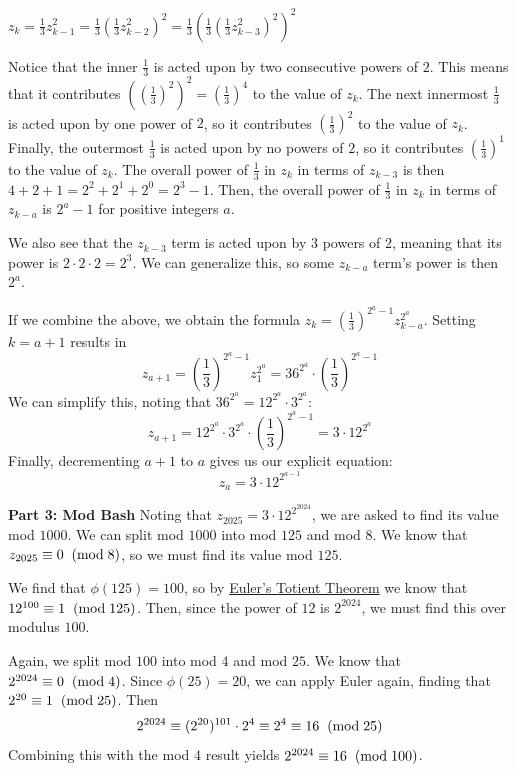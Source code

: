 \begin{enumerate}
 $z_k=\frac{1}{3}z_{k-1}^2=\frac{1}{3}\left(\frac{1}{3}z_{k-2}^2\right)^2=\frac{1}{3}\left(\frac{1}{3}\left(\frac{1}{3}z_{k-3}^2\right)^2\right)^2$

 Notice that the inner $\frac{1}{3}$ is acted upon by two consecutive powers of $2$. This means that it contributes $\left(\left(\frac{1}{3}\right)^2\right)^2=\left(\frac{1}{3}\right)^4$ to the value of $z_k$. The next innermost $\frac{1}{3}$ is acted upon by one power of $2$, so it contributes $\left(\frac{1}{3}\right)^2$ to the value of $z_k$. Finally, the outermost $\frac{1}{3}$ is acted upon by no powers of $2$, so it contributes $\left(\frac{1}{3}\right)^1$ to the value of $z_k$. The overall power of $\frac{1}{3}$ in $z_k$ in terms of $z_{k-3}$ is then $4+2+1=2^2+2^1+2^0=2^3-1$. Then, the overall power of $\frac{1}{3}$ in $z_k$ in terms of $z_{k-a}$ is $2^a-1$ for positive integers $a$.

 We also see that the $z_{k-3}$ term is acted upon by $3$ powers of $2$, meaning that its power is $2\cdot2\cdot2=2^3$. We can generalize this, so some $z_{k-a}$ term's power is then $2^a$.

 If we combine the above, we obtain the formula $z_k=\left(\frac{1}{3}\right)^{2^a-1}z_{k-a}^{2^a}$. Setting $k=a+1$ results in
 \[z_{a+1}=\left(\frac{1}{3}\right)^{2^a-1}z_1^{2^a}=36^{2^a}\cdot\left(\frac{1}{3}\right)^{2^a-1}\]We can simplify this, noting that $36^{2^a}=12^{2^a}\cdot3^{2^a}$:
 \[z_{a+1}=12^{2^a}\cdot3^{2^a}\cdot\left(\frac{1}{3}\right)^{2^a-1}=3\cdot12^{2^a}\]Finally, decrementing $a+1$ to $a$ gives us our explicit equation:
 \[z_a=3\cdot12^{2^{a-1}}\]

 \textbf{Part 3: Mod Bash} Noting that $z_{2025}=3\cdot12^{2^{2024}}$, we are asked to find its value mod $1000$. We can split mod $1000$ into mod $125$ and mod $8$. We know that $z_{2025}\equiv0\hspace{2mm}(\text{mod}\hspace{1mm}8)$, so we must find its value mod $125$.

 We find that $\phi(125)=100$, so by \href{https://artofproblemsolving.com/wiki/index.php?title=Euler\%27s\_Totient\_Theorem}{Euler's Totient Theorem} we know that $12^{100}\equiv1\hspace{2mm}(\text{mod}\hspace{1mm}125)$. Then, since the power of $12$ is $2^{2024}$, we must find this over modulus $100$.

 Again, we split mod $100$ into mod $4$ and mod $25$. We know that $2^{2024}\equiv0\hspace{2mm}(\text{mod}\hspace{1mm}4)$. Since $\phi(25)=20$, we can apply Euler again, finding that $2^{20}\equiv1\hspace{2mm}(\text{mod}\hspace{1mm}25)$. Then
 \[2^{2024}\equiv(2^{20})^{101}\cdot2^4\equiv2^4\equiv16\hspace{2mm}(\text{mod}\hspace{1mm}25)\]Combining this with the mod $4$ result yields $2^{2024}\equiv16\hspace{2mm}(\text{mod}\hspace{1mm}100)$.


\end{enumerate}
